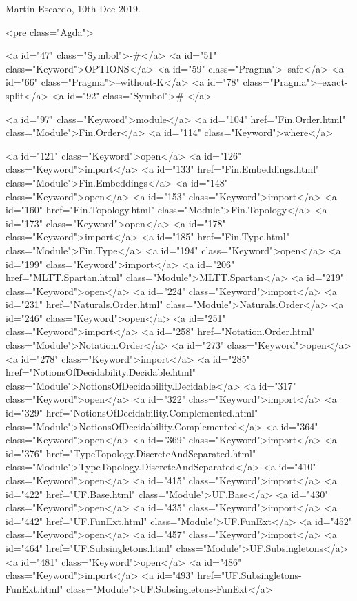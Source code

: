 Martin Escardo, 10th Dec 2019.

<pre class="Agda">

<a id="47" class="Symbol">{-#</a> <a id="51" class="Keyword">OPTIONS</a> <a id="59" class="Pragma">--safe</a> <a id="66" class="Pragma">--without-K</a> <a id="78" class="Pragma">--exact-split</a> <a id="92" class="Symbol">#-}</a>

<a id="97" class="Keyword">module</a> <a id="104" href="Fin.Order.html" class="Module">Fin.Order</a> <a id="114" class="Keyword">where</a>

<a id="121" class="Keyword">open</a> <a id="126" class="Keyword">import</a> <a id="133" href="Fin.Embeddings.html" class="Module">Fin.Embeddings</a>
<a id="148" class="Keyword">open</a> <a id="153" class="Keyword">import</a> <a id="160" href="Fin.Topology.html" class="Module">Fin.Topology</a>
<a id="173" class="Keyword">open</a> <a id="178" class="Keyword">import</a> <a id="185" href="Fin.Type.html" class="Module">Fin.Type</a>
<a id="194" class="Keyword">open</a> <a id="199" class="Keyword">import</a> <a id="206" href="MLTT.Spartan.html" class="Module">MLTT.Spartan</a>
<a id="219" class="Keyword">open</a> <a id="224" class="Keyword">import</a> <a id="231" href="Naturals.Order.html" class="Module">Naturals.Order</a>
<a id="246" class="Keyword">open</a> <a id="251" class="Keyword">import</a> <a id="258" href="Notation.Order.html" class="Module">Notation.Order</a>
<a id="273" class="Keyword">open</a> <a id="278" class="Keyword">import</a> <a id="285" href="NotionsOfDecidability.Decidable.html" class="Module">NotionsOfDecidability.Decidable</a>
<a id="317" class="Keyword">open</a> <a id="322" class="Keyword">import</a> <a id="329" href="NotionsOfDecidability.Complemented.html" class="Module">NotionsOfDecidability.Complemented</a>
<a id="364" class="Keyword">open</a> <a id="369" class="Keyword">import</a> <a id="376" href="TypeTopology.DiscreteAndSeparated.html" class="Module">TypeTopology.DiscreteAndSeparated</a>
<a id="410" class="Keyword">open</a> <a id="415" class="Keyword">import</a> <a id="422" href="UF.Base.html" class="Module">UF.Base</a>
<a id="430" class="Keyword">open</a> <a id="435" class="Keyword">import</a> <a id="442" href="UF.FunExt.html" class="Module">UF.FunExt</a>
<a id="452" class="Keyword">open</a> <a id="457" class="Keyword">import</a> <a id="464" href="UF.Subsingletons.html" class="Module">UF.Subsingletons</a>
<a id="481" class="Keyword">open</a> <a id="486" class="Keyword">import</a> <a id="493" href="UF.Subsingletons-FunExt.html" class="Module">UF.Subsingletons-FunExt</a>

